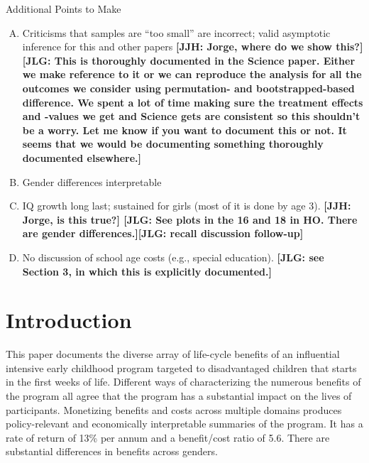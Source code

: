 \noindent Additional Points to Make
\begin{enumerate}[(A)]
\item Criticisms that samples are ``too small'' are incorrect; valid asymptotic inference for this and other papers \textbf{[JJH: Jorge, where do we show this?] [JLG: This is thoroughly documented in the Science paper. Either we make reference to it or we can reproduce the analysis for all the outcomes we consider using permutation- and bootstrapped-based difference. We spent a lot of time making sure the treatment effects and -values we get and Science gets are consistent so this shouldn't be a worry. Let me know if you want to document this or not. It seems that we would be documenting something thoroughly documented elsewhere.]}
\item Gender differences interpretable
\item IQ growth long last; sustained for girls (most of it is done by age 3). \textbf{[JJH: Jorge, is this true?] [JLG: See plots in the 16 and 18 in HO. There are gender differences.][JLG: recall discussion follow-up]}
\item No discussion of school age costs (e.g., special education). \textbf{[JLG: see Section 3, in which this is explicitly documented.]}
\end{enumerate}


\clearpage

\section{Introduction}

This paper documents the diverse array of life-cycle benefits of an influential intensive early childhood program targeted to disadvantaged children that starts in the first weeks of life. Different ways of characterizing the numerous benefits of the program all agree that the program has a substantial impact on the lives of participants. Monetizing benefits and costs across multiple domains produces policy-relevant and economically interpretable summaries of the program. It has a rate of return of 13\% per annum and a benefit/cost ratio of 5.6. There are substantial differences in benefits across genders.

